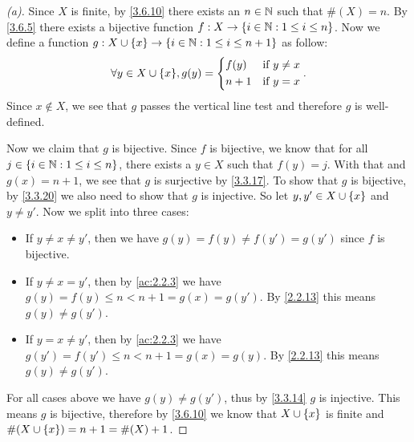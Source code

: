 \begin{proof}[(a)]
	Since \(X\) is finite, by \cref{3.6.10} there exists an \(n \in \mathbb{N}\) such that \(\#(X) = n\).
	By \cref{3.6.5} there exists a bijective function \(f : X \to \left\lbrace i \in \mathbb{N} : 1 \leq i \leq n\right\rbrace\).
	Now we define a function \(g : X \cup \left\lbrace x\right\rbrace \to \left\lbrace i \in \mathbb{N} : 1 \leq i \leq n + 1\right\rbrace\) as follow:
	\[
		\forall y \in X \cup \set{x}, g(y) = \begin{dcases}
			f(y)  & \text{if } y \neq x \\
			n + 1 & \text{if } y = x
		\end{dcases}.
	\]
	Since \(x \notin X\), we see that \(g\) passes the vertical line test and therefore \(g\) is well-defined.

	Now we claim that \(g\) is bijective.
	Since \(f\) is bijective, we know that for all \(j \in \left\lbrace i \in \mathbb{N} : 1 \leq i \leq n\right\rbrace\), there exists a \(y \in X\) such that \(f(y) = j\).
	With that and \(g(x) = n + 1\), we see that \(g\) is surjective by \cref{3.3.17}.
	To show that \(g\) is bijective, by \cref{3.3.20} we also need to show that \(g\) is injective.
	So let \(y, y' \in X \cup \left\lbrace x\right\rbrace\) and \(y \neq y'\).
	Now we split into three cases:
	\begin{itemize}
		\item If \(y \neq x \neq y'\), then we have \(g(y) = f(y) \neq f(y') = g(y')\) since \(f\) is bijective.
		\item If \(y \neq x = y'\), then by \cref{ac:2.2.3} we have \(g(y) = f(y) \leq n < n + 1 = g(x) = g(y')\).
		      By \cref{2.2.13} this means \(g(y) \neq g(y')\).
		\item If \(y = x \neq y'\), then by \cref{ac:2.2.3} we have \(g(y') = f(y') \leq n < n + 1 = g(x) = g(y)\).
		      By \cref{2.2.13} this means \(g(y) \neq g(y')\).
	\end{itemize}
	For all cases above we have \(g(y) \neq g(y')\), thus by \cref{3.3.14} \(g\) is injective.
	This means \(g\) is bijective, therefore by \cref{3.6.10} we know that \(X \cup \left\lbrace x\right\rbrace\) is finite and \(\#(X \cup \left\lbrace x\right\rbrace) = n + 1 = \#(X) + 1\).
\end{proof}

